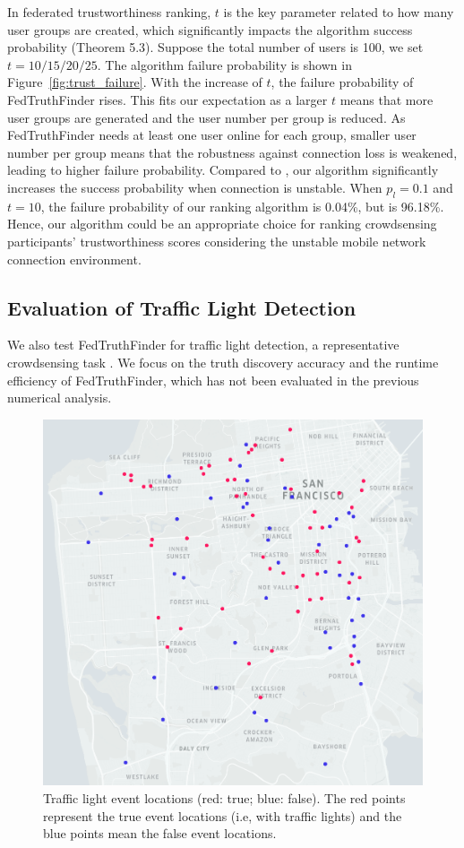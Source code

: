 In federated trustworthiness ranking, $t$ is the key parameter related to how many user groups are created, which significantly impacts the algorithm success probability (Theorem 5.3). Suppose the total number of users is 100, we set $t=10/15/20/25$. The algorithm failure probability is shown in Figure~\ref{fig:trust_failure}. With the increase of $t$, the failure probability of FedTruthFinder rises. This fits our expectation as a larger $t$ means that more user groups are generated and the user number per group is reduced. As FedTruthFinder needs at least one user online for each group, smaller user number per group means that the robustness against connection loss is weakened, leading to higher failure probability. Compared to \citet{tang2011secure}, our algorithm significantly increases the success probability when connection is unstable. When $p_l = 0.1$ and $t=10$, the failure probability of our ranking algorithm is 0.04\%, but \citet{tang2011secure} is 96.18\%.
Hence, our algorithm could be an appropriate choice for ranking crowdsensing participants' trustworthiness scores considering the unstable mobile network connection environment.



\subsection{Evaluation of Traffic Light Detection}

We also test FedTruthFinder for traffic light detection, a representative crowdsensing task \citep{ouyang2015truth,wang2013credibility}. We focus on the truth discovery accuracy and the runtime efficiency of FedTruthFinder, which has not been evaluated in the previous numerical analysis.


\begin{figure}[t]
	\centering
	\includegraphics[width=.8\linewidth]{submissions/LeyeWang/fig/traffic_light_map.png}
	\caption{Traffic light event locations (red: true; blue: false). The red points represent the true event locations (i.e, with traffic lights) and the blue points mean the false event locations.}
	\label{fig:traffic_light_map}
\end{figure}

